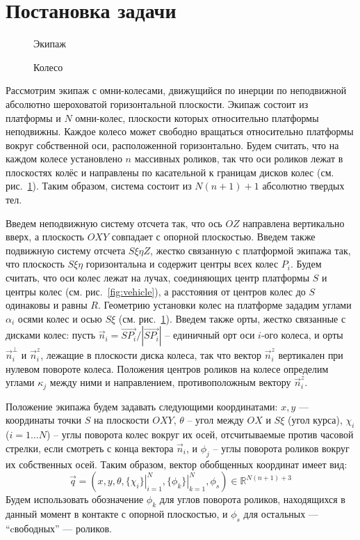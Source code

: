 \section{Постановка задачи}

\begin{figure}
        \centering
        \caption{Экипаж}
        \label{fig:vehicle}
    \endminipage
        \centering
        \caption{Колесо}
        \label{fig:wheel}
    \endminipage
\end{figure}

Рассмотрим экипаж с омни-колесами, движущийся по инерции по неподвижной абсолютно шероховатой горизонтальной плоскости. Экипаж состоит из платформы и $N$ омни-колес, плоскости которых относительно платформы неподвижны. Каждое колесо может свободно вращаться относительно платформы вокруг собственной оси, расположенной горизонтально. Будем считать, что на каждом колесе установлено $n$ массивных роликов, так что оси роликов лежат в плоскостях колёс и направлены по касательной к границам дисков колес (см. рис.~\ref{fig:wheel}). Таким образом, система состоит из $N(n+1) + 1$ абсолютно твердых тел. 

Введем неподвижную систему отсчета так, что ось $OZ$ направлена вертикально вверх, а плоскость $OXY$ совпадает с опорной плоскостью.
Введем также подвижную систему отсчета $S\xi\eta Z$, жестко связанную с платформой экипажа так, что плоскость $S\xi\eta$ горизонтальна и содержит центры всех колес $P_i$. Будем считать, что оси колес лежат на лучах, соединяющих центр платформы $S$ и центры колес (см. рис.~\ref{fig:vehicle}), а расстояния от центров колес до $S$ одинаковы и равны $R$. Геометрию установки колес на платформе зададим углами $\alpha_i$ осями колес и осью $S\xi$
(см. рис.~\ref{fig:wheel}). Введем также орты, жестко связанные с дисками колес: пусть $\vec{n}_i = \vec{SP_i}/|\vec{SP_i}|$ -- единичный орт оси $i$-ого колеса, и орты $\vec{n}_i^\perp$ и $\vec{n}_i^z$, лежащие в плоскости диска колеса, так что вектор $\vec{n}_i^z$ вертикален при нулевом повороте колеса. Положения центров роликов на колесе определим углами $\kappa_j$ между ними и направлением, противоположным вектору $\vec{n}_i^z$. 

Положение экипажа будем задавать следующими координатами:
$x, y$ --- координаты точки $S$ на плоскости $OXY$, $\theta$ -- угол между $OX$ и $S\xi$ (угол курса),
$\chi_i$ ($i = 1\dots N$) -- углы поворота колес вокруг их осей, отсчитываемые против часовой стрелки, если смотреть с конца вектора $\vec{n}_i$, и $\phi_j$ -- углы поворота роликов вокруг их собственных осей.
Таким образом, вектор обобщенных координат имеет вид:
$$\vec{q} = (x, y, \theta, \left.\{\chi_i\}\right|_{i=1}^N , \left.\{\phi_k\}\right|_{k=1}^N, \phi_s)\in\mathbb{R}^{N(n+1) + 3}$$ 
Будем использовать обозначение $\phi_k$ для углов поворота роликов, находящихся в данный момент в контакте с опорной плоскостью, и $\phi_s$ для остальных --- ``cвободных'' --- роликов.

